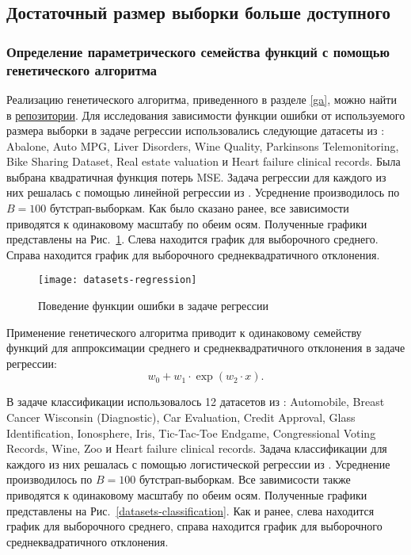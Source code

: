 \clearpage
\subsection{Достаточный размер выборки больше доступного}

\subsubsection{Определение параметрического семейства функций с помощью генетического алгоритма}

Реализацию генетического алгоритма, приведенного в разделе \ref{ga}, можно найти в \href{https://github.com/kisnikser/Bayesian-Sample-Size-Estimation/tree/main/code/genetic_algorithm}{репозитории}. Для исследования зависимости функции ошибки от используемого размера выборки в задаче регрессии использовались следующие датасеты из \citep{UCI}: Abalone, Auto MPG, Liver Disorders, Wine Quality, Parkinsons Telemonitoring, Bike Sharing Dataset, Real estate valuation и Heart failure clinical records. Была выбрана квадратичная функция потерь MSE. Задача регрессии для каждого из них решалась с помощью линейной регрессии из \citep{scikit-learn}. Усреднение производилось по $B = 100$ бутстрап-выборкам. Как было сказано ранее, все зависимости приводятся к одинаковому масштабу по обеим осям. Полученные графики представлены на Рис.~\ref{datasets-regression}. Слева находится график для выборочного среднего. Справа находится график для выборочного среднеквадратичного отклонения.

\begin{figure}[h!]
    \centering
    \texttt{[image: datasets-regression]}
    \caption{Поведение функции ошибки в задаче регрессии}
    \label{datasets-regression}
\end{figure}

Применение генетического алгоритма приводит к одинаковому семейству функций для аппроксимации среднего и среднеквадратичного отклонения в задаче регрессии:
\[ w_0 + w_1 \cdot \exp(w_2 \cdot x). \]

В задаче классификации использовалось 12 датасетов из \citep{UCI}: Automobile, Breast Cancer Wisconsin (Diagnostic), Car Evaluation, Credit Approval, Glass Identification, Ionosphere, Iris, Tic-Tac-Toe Endgame, Congressional Voting Records, Wine, Zoo и Heart failure clinical records. Задача классификации для каждого из них решалась с помощью логистической регрессии из \citep{scikit-learn}. Усреднение производилось по $B = 100$ бутстрап-выборкам. Все завимисости также приводятся к одинаковому масштабу по обеим осям. Полученные графики представлены на Рис.~\ref{datasets-classification}. Как и ранее, слева находится график для выборочного среднего, справа находится график для выборочного среднеквадратичного отклонения.

